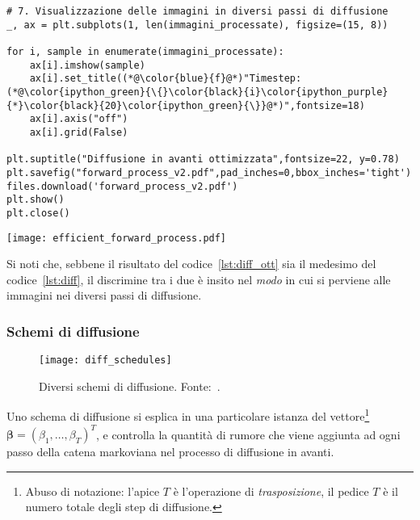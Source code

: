 \begin{lstlisting}[language=iPython,caption=Diffusione in avanti ottimizzata. Codice adattato da~\cite{nain2022},label=lst:diff_ott]
# 7. Visualizzazione delle immagini in diversi passi di diffusione
_, ax = plt.subplots(1, len(immagini_processate), figsize=(15, 8))

for i, sample in enumerate(immagini_processate):
    ax[i].imshow(sample)
    ax[i].set_title((*@\color{blue}{f}@*)"Timestep: (*@\color{ipython_green}{\{}\color{black}{i}\color{ipython_purple}{*}\color{black}{20}\color{ipython_green}{\}}@*)",fontsize=18)
    ax[i].axis("off")
    ax[i].grid(False)

plt.suptitle("Diffusione in avanti ottimizzata",fontsize=22, y=0.78)
plt.savefig("forward_process_v2.pdf",pad_inches=0,bbox_inches='tight')
files.download('forward_process_v2.pdf')
plt.show()
plt.close()
\end{lstlisting}
\begin{center}
\texttt{[image: efficient\_forward\_process.pdf]}
\end{center}
Si noti che, sebbene il risultato del codice~\ref{lst:diff_ott} sia il medesimo del codice~\ref{lst:diff}, il discrimine tra i due è 
insito nel \emph{modo} in cui si perviene alle immagini nei diversi passi di diffusione.

\subsubsection{Schemi di diffusione}\label{sssec:diff_schedules}

\begin{figure}
  \centering
  \texttt{[image: diff\_schedules]}
  \caption{Diversi schemi di diffusione. Fonte:~\cite{changDesignFundDiffusion2023}.}
  \label{fig:diff_schedules}
\end{figure}

Uno schema di diffusione si esplica in una particolare istanza del 
vettore\footnote{Abuso di notazione: l'apice $T$ è l'operazione di \emph{trasposizione},
il pedice $T$ è il numero totale degli step di diffusione.} $\bm{\beta}=(\beta_1,\dots,\beta_T)^T$, e controlla la quantità di rumore 
che viene aggiunta ad ogni passo della catena markoviana nel processo di diffusione in avanti.

